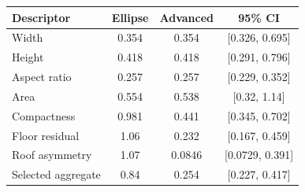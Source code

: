 \begin{tabularx}{\columnwidth}{@{}Yccc@{}}
\toprule
Descriptor & Ellipse & Advanced & 95\% CI \\
\midrule
Width & 0.354 & 0.354 & [0.326, 0.695] \\
Height & 0.418 & 0.418 & [0.291, 0.796] \\
Aspect ratio & 0.257 & 0.257 & [0.229, 0.352] \\
Area & 0.554 & 0.538 & [0.32, 1.14] \\
Compactness & 0.981 & 0.441 & [0.345, 0.702] \\
Floor residual & 1.06 & 0.232 & [0.167, 0.459] \\
Roof asymmetry & 1.07 & 0.0846 & [0.0729, 0.391] \\
Selected aggregate & 0.84 & 0.254 & [0.227, 0.417] \\
\bottomrule
\end{tabularx}
